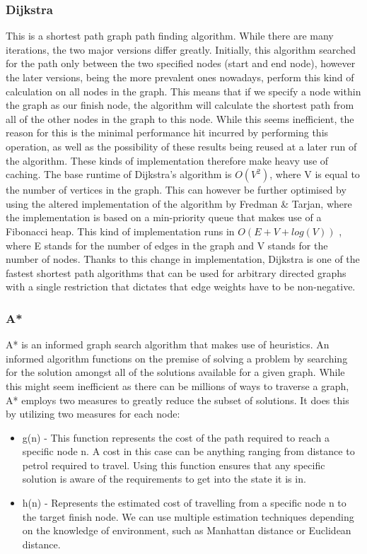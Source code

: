 \documentclass[main.tex]{subfiles}
\begin{document}
\subsubsection{Dijkstra}
This is a shortest path graph path finding algorithm. While there are many iterations, the two major versions differ greatly. Initially, this algorithm searched for the path only between the two specified nodes (start and end node), however the later versions, being the more prevalent ones nowadays, perform this kind of calculation on all nodes in the graph. This means that if we specify a node within the graph as our finish node, the algorithm will calculate the shortest path from all of the other nodes in the graph to this node. While this seems inefficient, the reason for this is the minimal performance hit incurred by performing this operation, as well as the possibility of these results being reused at a later run of the algorithm. These kinds of implementation therefore make heavy use of caching.
The base runtime of Dijkstra's algorithm is $O(V^2)$, where V is equal to the number of vertices in the graph. This can however be further optimised by using the altered implementation of the algorithm by Fredman \& Tarjan\cite{algoImprovedDijkstra}, where the implementation is based on a min-priority queue that makes use of a Fibonacci heap. This kind of implementation runs in $O( E + V + log(V) )$ , where E stands for the number of edges in the graph and V stands for the number of nodes. Thanks to this change in implementation, Dijkstra is one of the fastest shortest path algorithms that can be used for arbitrary directed graphs with a single restriction that dictates that edge weights have to be non-negative.


\subsubsection{A*}
A* is an informed graph search algorithm that makes use of heuristics.  An informed algorithm functions on the premise of solving a problem by searching for the solution amongst all of the solutions available for a given graph. While this might seem inefficient as there can be millions of ways to traverse a graph, A* employs two measures to greatly reduce the subset of solutions. It does this by utilizing two measures for each node:
\begin{itemize}
\item g(n) - This function represents the cost of the path required to reach a specific node n. A cost in this case can be anything ranging from distance to petrol required to travel. Using this function ensures that any specific solution is aware of the requirements to get into the state it is in.
\item h(n) - Represents the estimated cost of travelling from a specific node n to the target finish node. We can use multiple estimation techniques depending on the knowledge of environment, such as Manhattan distance or Euclidean distance.
\end{itemize}
\end{document}
